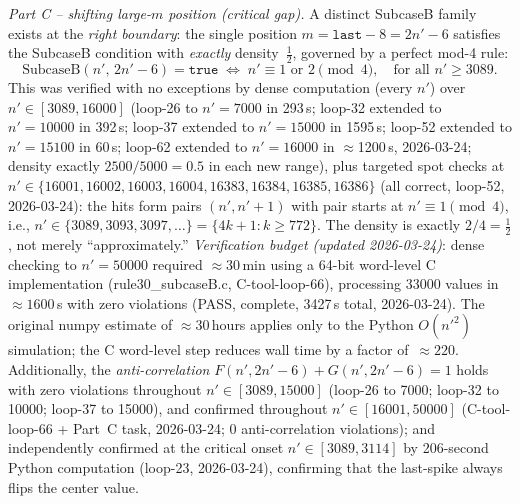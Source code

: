 \documentclass[11pt]{article}
\theoremstyle{plain}
\theoremstyle{definition}
\begin{document}
\emph{Part C -- shifting large-$m$ position (critical gap).}  A distinct SubcaseB
family exists at the \emph{right boundary}: the single position
$m = \mathtt{last}{-}8 = 2n'{-}6$ satisfies the SubcaseB condition with
\emph{exactly} density~$\frac{1}{2}$, governed by a perfect mod-4 rule:
\[
  \text{SubcaseB}(n',\, 2n'{-}6) = \mathtt{true} \;\iff\; n' \equiv 1 \text{ or } 2 \pmod{4},
  \quad \text{for all } n' \geq 3089.
\]
This was verified with no exceptions by dense computation (every $n'$) over
$n'\in[3089, 16000]$ (loop-26 to $n'=7000$ in 293\,s;
loop-32 extended to $n'=10000$ in 392\,s; loop-37 extended to $n'=15000$ in 1595\,s;
loop-52 extended to $n'=15100$ in 60\,s;
loop-62 extended to $n'=16000$ in $\approx$1200\,s, 2026-03-24;
density exactly $2500/5000 = 0.5$ in each new range),
plus targeted spot checks at $n'\in\{16001,16002,16003,16004,16383,16384,16385,16386\}$
(all correct, loop-52, 2026-03-24):
the hits form pairs $(n', n'+1)$ with pair starts at $n' \equiv 1 \pmod 4$,
i.e., $n' \in \{3089, 3093, 3097, \ldots\} = \{4k+1 : k \geq 772\}$.
The density is exactly $2/4 = \frac{1}{2}$, not merely ``approximately.''
\emph{Verification budget (updated 2026-03-24)}: dense checking to $n'=50000$
required ${\approx}30$\,min using a 64-bit word-level C implementation
(rule30\_subcaseB.c, C-tool-loop-66), processing 33000 values in ${\approx}1600$\,s
with zero violations (PASS, complete, 3427\,s total, 2026-03-24).
The original numpy estimate of ${\approx}30$\,hours applies only to the Python $O(n'^2)$
simulation; the C word-level step reduces wall time by a factor of~${\approx}220$.
Additionally, the \emph{anti-correlation} $F(n',2n'{-}6) + G(n',2n'{-}6) = 1$ holds
with zero violations throughout $n'\in[3089, 15000]$ (loop-26 to 7000; loop-32 to 10000; loop-37 to 15000),
and confirmed throughout $n'\in[16001, 50000]$ (C-tool-loop-66 + Part~C task, 2026-03-24; 0 anti-correlation violations);
and independently confirmed at the critical onset $n'\in[3089,3114]$ by 206-second
Python computation (loop-23, 2026-03-24), confirming that the last-spike always
flips the center value.
\end{document}
